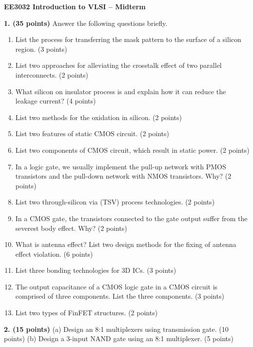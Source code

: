 \documentclass[10pt]{article}
\begin{document}
\begin{center}{\large\bfseries EE3032 Introduction to VLSI -- Midterm}\end{center}
\textbf{1. (35 points)} Answer the following questions briefly.
\begin{enumerate}[label=(\alph*),leftmargin=7mm,itemsep=2pt,topsep=2pt]
\item List the process for transferring the mask pattern to the surface of a silicon region. (3 points)
\item List two approaches for alleviating the crosstalk effect of two parallel interconnects. (2 points)
\item What silicon on insulator process is and explain how it can reduce the leakage current? (4 points)
\item List two methods for the oxidation in silicon. (2 points)
\item List two features of static CMOS circuit. (2 points)
\item List two components of CMOS circuit, which result in static power. (2 points)
\item In a logic gate, we usually implement the pull-up network with PMOS transistors and the pull-down network with NMOS transistors. Why? (2 points)
\item List two through-silicon via (TSV) process technologies. (2 points)
\item In a CMOS gate, the transistors connected to the gate output suffer from the severest body effect. Why? (2 points)
\item What is antenna effect? List two design methods for the fixing of antenna effect violation. (6 points)
\item List three bonding technologies for 3D ICs. (3 points)
\item The output capacitance of a CMOS logic gate in a CMOS circuit is comprised of three components. List the three components. (3 points)
\item List two types of FinFET structures. (2 points)
\end{enumerate}
\textbf{2. (15 points)} (a) Design an 8:1 multiplexers using transmission gate. (10 points) (b) Design a 3-input NAND gate using an 8:1 multiplexer. (5 points)
\end{document}
